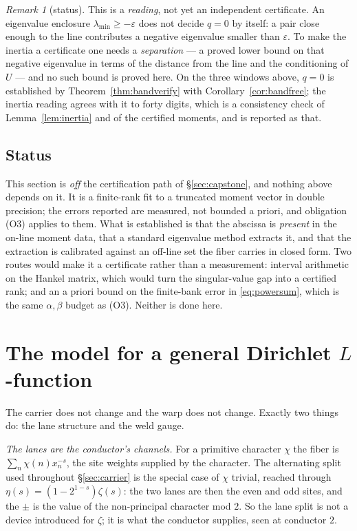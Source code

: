 \documentclass[11pt]{article}
\theoremstyle{plain}
\theoremstyle{definition}
\theoremstyle{remark}
\newtheorem{remark}[theorem]{Remark}
\begin{document}
\begin{remark}[status]
This is a \emph{reading}, not yet an independent certificate. An eigenvalue enclosure
$\lambda_{\min}\ge-\varepsilon$ does not decide $q=0$ by itself: a pair close enough to
the line contributes a negative eigenvalue smaller than $\varepsilon$. To make the inertia
a certificate one needs a \emph{separation} --- a proved lower bound on that negative
eigenvalue in terms of the distance from the line and the conditioning of $U$ --- and no
such bound is proved here. On the three windows above, $q=0$ is established by
Theorem~\ref{thm:bandverify} with Corollary~\ref{cor:bandfree}; the inertia reading agrees
with it to forty digits, which is a consistency check of Lemma~\ref{lem:inertia} and of the
certified moments, and is reported as that.
\end{remark}

\subsection{Status}
This section is \emph{off} the certification path of \S\ref{sec:capstone}, and nothing
above depends on it. It is a finite-rank fit to a truncated moment vector in double
precision; the errors reported are measured, not bounded a priori, and obligation
(O3) applies to them. What is established is that the abscissa is \emph{present} in the
on-line moment data, that a standard eigenvalue method extracts it, and that the
extraction is calibrated against an off-line set the fiber carries in closed form. Two
routes would make it a certificate rather than a measurement: interval arithmetic on
the Hankel matrix, which would turn the singular-value gap into a certified rank; and
an a priori bound on the finite-bank error in \eqref{eq:powersum}, which is the same
$\alpha,\beta$ budget as (O3). Neither is done here.

\section{The model for a general Dirichlet \texorpdfstring{$L$}{L}-function}\label{sec:general}

The carrier does not change and the warp does not change. Exactly two things do: the
lane structure and the weld gauge.

\emph{The lanes are the conductor's channels.} For a primitive character $\chi$ the
fiber is $\sum_n\chi(n)x_n^{-s}$, the site weights supplied by the character. The
alternating split used throughout \S\ref{sec:carrier} is the special case of $\chi$
trivial, reached through $\eta(s)=(1-2^{1-s})\zeta(s)$: the two lanes are then the even
and odd sites, and the $\pm$ is the value of the non-principal character mod $2$. So
the lane split is not a device introduced for $\zeta$; it is what the conductor
supplies, seen at conductor $2$.
\end{document}
